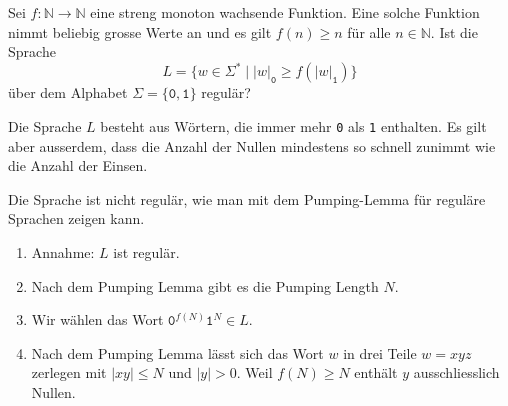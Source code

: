 Sei $f\colon \mathbb{N}\to\mathbb{N}$ eine streng monoton wachsende Funktion.
Eine solche Funktion nimmt beliebig grosse Werte an und es 
gilt $f(n) \ge n$ für alle $n\in\mathbb{N}$.
Ist die Sprache
\[
L=
\{
w\in\Sigma^*
\;|\;
|w|_{\texttt{0}}
\ge f(|w|_{\texttt{1}})
\}
\]
über dem Alphabet $\Sigma=\{\texttt{0},\texttt{1}\}$ regulär?

\begin{hinweis}
Die Sprache $L$ besteht aus Wörtern, die immer mehr \texttt{0} als \texttt{1}
enthalten.
Es gilt aber ausserdem, dass die Anzahl der Nullen mindestens so schnell
zunimmt wie die Anzahl der Einsen.
\end{hinweis}


\begin{loesung}
Die Sprache ist nicht regulär, wie man mit dem Pumping-Lemma für
reguläre Sprachen zeigen kann.
\begin{enumerate}
\item Annahme: $L$ ist regulär.
\item Nach dem Pumping Lemma gibt es die Pumping Length $N$.
\item Wir wählen das Wort $\texttt{0}^{f(N)}\texttt{1}^N\in L$.
\item Nach dem Pumping Lemma lässt sich das Wort $w$ in drei Teile
$w=xyz$
zerlegen mit $|xy|\le N$ und $|y|>0$.
Weil $f(N)\ge N$ enthält $y$ ausschliesslich Nullen.
\begin{center}
\end{center}
\end{enumerate}
\end{loesung}
